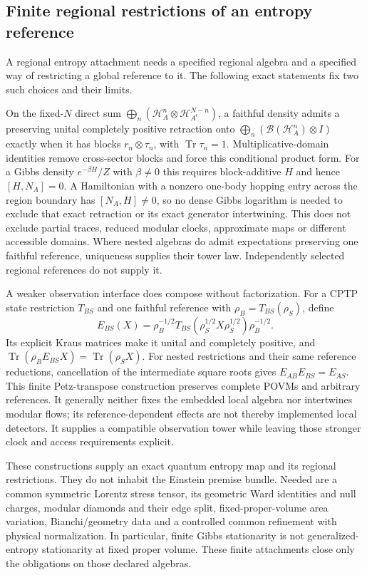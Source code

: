 \subsection{Finite regional restrictions of an entropy reference}
\label{subsec:finite-field-stress-entropy}

A regional entropy attachment needs a specified regional algebra and a
specified way of restricting a global reference to it. The following exact
statements fix two such choices and their limits.

On the fixed-$N$ direct sum
$\bigoplus_n(\mathcal H_A^n\otimes\mathcal H_{A^c}^{N-n})$, a faithful
density admits a preserving unital completely positive retraction onto
$\bigoplus_n(\mathcal B(\mathcal H_A^n)\otimes I)$ exactly when it has
blocks $r_n\otimes\tau_n$, with $\operatorname{Tr}\tau_n=1$.
Multiplicative-domain identities remove cross-sector blocks and force
this conditional product form. For a Gibbs density $e^{-\beta H}/Z$ with
$\beta\ne0$ this requires block-additive $H$ and hence $[H,N_A]=0$. A
Hamiltonian with a nonzero one-body hopping entry across the region boundary
has $[N_A,H]\ne0$, so no dense
Gibbs logarithm is needed to exclude that exact retraction or its exact
generator intertwining. This does not exclude partial traces,
reduced modular clocks, approximate maps or different accessible domains.
Where nested algebras do admit expectations preserving one faithful
reference, uniqueness supplies their tower law. Independently selected
regional references do not supply it.

A weaker observation interface does compose without factorization. For a
CPTP state restriction $T_{BS}$ and one faithful reference with
$\rho_B=T_{BS}(\rho_S)$, define
\[
 E_{BS}(X)=\rho_B^{-1/2}
 T_{BS}(\rho_S^{1/2}X\rho_S^{1/2})\rho_B^{-1/2}.
\]
Its explicit Kraus matrices make it unital and completely positive, and
$\operatorname{Tr}(\rho_BE_{BS}X)=\operatorname{Tr}(\rho_SX)$.
For nested restrictions and their same reference reductions, cancellation
of the intermediate square roots gives $E_{AB}E_{BS}=E_{AS}$.
This finite Petz-transpose construction preserves complete POVMs and
arbitrary references. It generally neither fixes the embedded local
algebra nor intertwines modular flows; its reference-dependent effects
are not thereby implemented local detectors. It supplies a
compatible observation tower while leaving those stronger clock and access
requirements explicit.

These constructions supply an exact quantum entropy map and its regional
restrictions. They do not inhabit the Einstein premise bundle. Needed are a common symmetric Lorentz stress tensor, its
geometric Ward identities and null charges, modular diamonds and their
edge split, fixed-proper-volume area variation, Bianchi/geometry data and
a controlled common refinement with physical normalization. In particular,
finite Gibbs stationarity is not generalized-entropy stationarity at fixed
proper volume. These finite attachments close only the obligations on
those declared algebras.
